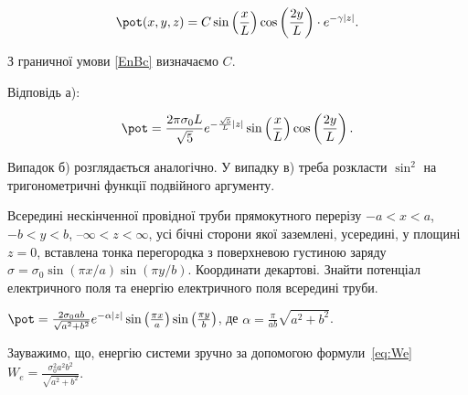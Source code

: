 \begin{problem}
\begin{solution}
	\begin{equation*}
		\pot (x,y,z) = C \sin\left( \frac{x}{L} \right)   \cos\left( \frac{2y}{L} \right)  \cdot e^{-\gamma |z|}.
	\end{equation*}

З граничної умови \eqref{EnBc} визначаємо $C$.

Відповідь а):

	\begin{equation*}
		\pot = \frac{2\pi\sigma_0 L}{\sqrt{5}}e^{-\frac{\sqrt{5}}{L}|z|}\sin\left( \frac{x}{L}\right) \cos\left( \frac{2y}{L}\right) .
	\end{equation*}
\end{solution}

Випадок б) розглядається аналогічно. У випадку в) треба розкласти $\sin^2$ на тригонометричні функції подвійного аргументу.

\end{problem}

\begin{problem}
Всередині нескінченної провідної труби прямокутного перерізу $-a<x<a$, $-b<y<b$, $–\infty<z<\infty$, усі бічні сторони якої заземлені, усередині, у площині $z=0$, вставлена тонка перегородка з поверхневою густиною заряду $\sigma  = {\sigma _0}\sin (\pi x/a)\sin (\pi y/b)$. Координати декартові. Знайти потенціал електричного поля та енергію електричного поля всередині труби.
\begin{solution}
	$\pot  = \frac{{2{\sigma _0}ab}}{{\sqrt {{a^2} + {b^2}} }}{e^{ - \alpha |z|}}\sin \left( {\frac{{\pi x}}{a}} \right)\sin \left( {\frac{{\pi y}}{b}} \right)$, де $\alpha  = \frac{\pi }{{ab}}\sqrt {{a^2} + {b^2}}$.

    Зауважимо, що, енергію системи зручно за допомогою формули~\eqref{eq:We}
	$W_e =  \frac{{\sigma _0^2{a^2}{b^2}}}{{\sqrt {{a^2} + {b^2}} }}$.
\end{solution}
\end{problem}


